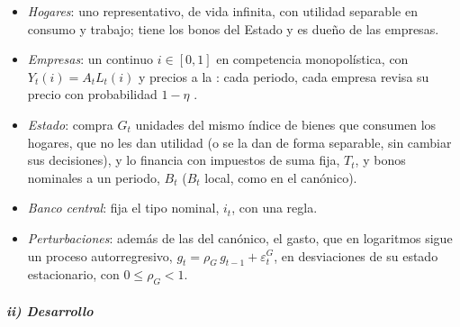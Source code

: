 \documentclass[11pt]{article}
\begin{document}
\begin{itemize}
\item \emph{Hogares}: uno representativo, de vida infinita, con utilidad separable en consumo y trabajo; tiene los bonos del Estado y es dueño de las empresas.
\item \emph{Empresas}: un continuo $i\in[0,1]$ en competencia monopolística, con $Y_t(i)=A_tL_t(i)$ y precios a la : cada periodo, cada empresa revisa su precio con probabilidad $1-\eta$ .
\item \emph{Estado}: compra $G_t$ unidades del mismo índice de bienes que consumen los hogares, que no les dan utilidad (o se la dan de forma separable, sin cambiar sus decisiones), y lo financia con impuestos de suma fija, $T_t$, y bonos nominales a un periodo, $B_t$ ($B_t$ local, como en el canónico).
\item \emph{Banco central}: fija el tipo nominal, $i_t$, con una regla.
\item \emph{Perturbaciones}: además de las del canónico, el gasto, que en logaritmos sigue un proceso autorregresivo, $g_t=\rho_G\,g_{t-1}+\varepsilon^G_t$, en desviaciones de su estado estacionario, con $0\le\rho_G<1$.
\end{itemize}

\subparagraph{ii) Desarrollo}
\end{document}

